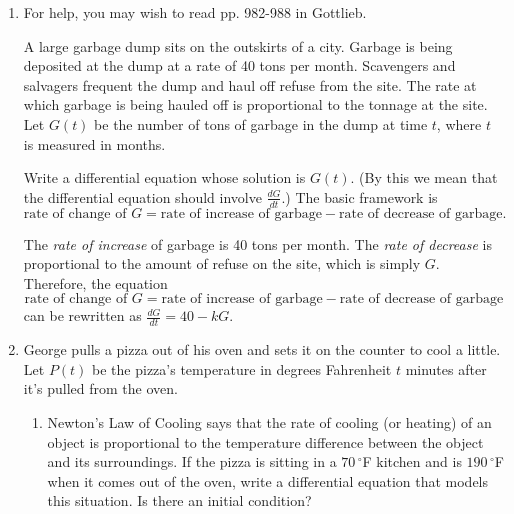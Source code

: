 \documentclass{article}
\begin{document}
\begin{enumerate}
\item

  For help, you may wish to read pp. 982-988 in Gottlieb.

  \begin{problem}
    A large garbage dump sits on the outskirts of a city. Garbage is being
    deposited at the dump at a rate of 40 tons per month. Scavengers and
    salvagers frequent the dump and haul off refuse from the site. The
    rate at which garbage is being hauled off is proportional to the
    tonnage at the site. Let $G(t)$ be the number of tons of garbage in
    the dump at time $t$, where $t$ is measured in months.

    Write a differential equation whose solution is $G(t)$. (By this we
    mean that the differential equation should involve $\frac{dG}{dt}$.)
    The basic framework is
    \[ \text{rate of change of } G = \text{rate of increase of garbage} -
    \text{rate of decrease of garbage}.\]   
  \end{problem}

  \pspace{\vfill}

  \begin{solution}
    The {\it rate of increase} of garbage is 40 tons per month.  The {\it
      rate of decrease} is proportional to the amount of refuse on the
    site, which is simply $G$.  Therefore, the equation
    \[ \text{rate of change of } G = \text{rate of increase of garbage} -
    \text{rate of decrease of garbage} \] can be rewritten as $\boxed{
      \frac{dG}{dt} = 40 - kG}$.
  \end{solution} 

\item 

  George pulls a pizza out of his oven and sets it on the counter to cool
  a little.  Let $P(t)$ be the pizza's temperature in degrees Fahrenheit $t$ minutes after it's
  pulled from the oven.
  \begin{enumerate}
  \item
    \begin{problem}
      Newton's Law of Cooling says that the rate of cooling (or heating)
      of an object is proportional to the temperature difference between
      the object and its surroundings.  If the pizza is sitting in a
      $70\,^\circ $F kitchen and is $190\,^\circ$F when it comes out of the oven,
      write a differential equation that models this situation.  Is there
      an initial condition?
    \end{problem}
    \pspace{\vfill}


\end{enumerate}
\end{enumerate}
\end{document}
